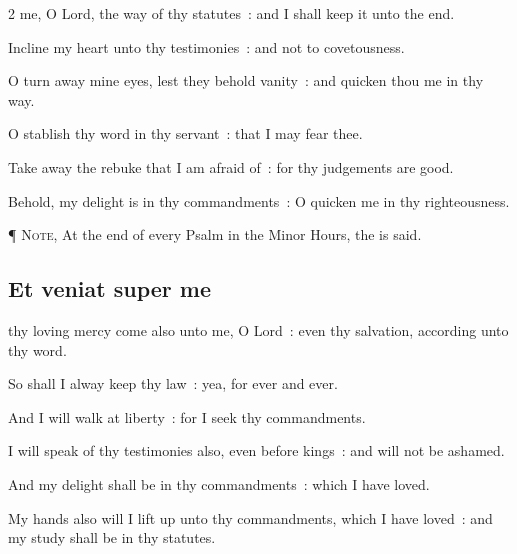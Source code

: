 \begin{multicols}{2}
 me, O Lord, the way of thy statutes~: and I shall keep it unto the end.\par
{}
Incline my heart unto thy testimonies~: and not to covetousness.\par
{}O turn away mine eyes, lest they behold vanity~: and quicken thou me in thy way.\par
{}O stablish thy word in thy servant~: that I may fear thee.\par
{}Take away the rebuke that I am afraid of~: for thy judgements are good.\par
{}Behold, my delight is in thy commandments~: O quicken me in thy righteousness.\par

\par\noindent
{\color{RubricRed}\P{ }\textsc{Note,} At the end of every Psalm in the Minor Hours, the  is said.}

\subsection{Et veniat super me}

 thy loving mercy come also unto me, O Lord~: even thy salvation, according unto thy word.\par
{}
So shall I alway keep thy law~: yea, for ever and ever.\par
{}And I will walk at liberty~: for I seek thy commandments.\par
{}I will speak of thy testimonies also, even before kings~: and will not be ashamed.\par
{}And my delight shall be in thy commandments~: which I have loved.\par
{}My hands also will I lift up unto thy commandments, which I have loved~: and my study shall be in thy statutes.\par


\end{multicols}
